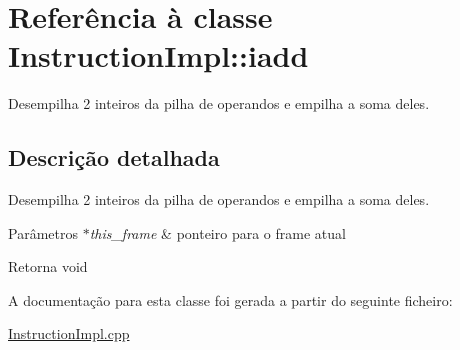 \hypertarget{class_instruction_impl_1_1iadd}{}\section{Referência à classe Instruction\+Impl\+:\+:iadd}
\label{class_instruction_impl_1_1iadd}


Desempilha 2 inteiros da pilha de operandos e empilha a soma deles.  




\subsection{Descrição detalhada}
Desempilha 2 inteiros da pilha de operandos e empilha a soma deles. 


\begin{DoxyParams}{Parâmetros}
{\em $\ast$this\+\_\+frame} & ponteiro para o frame atual \\
\hline
\end{DoxyParams}
\begin{DoxyReturn}{Retorna}
void 
\end{DoxyReturn}


A documentação para esta classe foi gerada a partir do seguinte ficheiro\+:\begin{DoxyCompactItemize}
\item 
\hyperlink{_instruction_impl_8cpp}{Instruction\+Impl.\+cpp}\end{DoxyCompactItemize}
